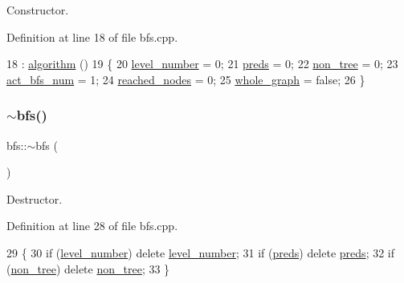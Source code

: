 Constructor. 



Definition at line 18 of file bfs.\+cpp.


\begin{DoxyCode}
18           : \mbox{\hyperlink{classalgorithm_ab79e1ddec2f2afdf4b36b10724db8b15}{algorithm}} () 
19 \{
20     \mbox{\hyperlink{classbfs_aab92e9d128612c28324aafe4750dbc84}{level\_number}} = 0;
21     \mbox{\hyperlink{classbfs_a3bac5ed333bb78a30a67099c3b94aa0c}{preds}} = 0;
22     \mbox{\hyperlink{classbfs_a056b2131db11e62eb8f41c8dcc117d2e}{non\_tree}} = 0;
23     \mbox{\hyperlink{classbfs_a5a4adad9562896536b8b58ab237e8478}{act\_bfs\_num}} = 1;
24     \mbox{\hyperlink{classbfs_ac3db80b59d5db049199936445a6c2da8}{reached\_nodes}} = 0;
25     \mbox{\hyperlink{classbfs_a6c08fbcc90d71f1cbdd03a1cdaa9dc99}{whole\_graph}} = \textcolor{keyword}{false};
26 \}
\end{DoxyCode}
\mbox{\label{classbfs_a6999a08f3cee2b54f07ffeac0d484df1}} 
\subsubsection{\texorpdfstring{$\sim$bfs()}{~bfs()}}
{\footnotesize\ttfamily bfs\+::$\sim$bfs (\begin{DoxyParamCaption}{ }\end{DoxyParamCaption})\hspace{0.3cm}{\ttfamily [virtual]}}



Destructor. 



Definition at line 28 of file bfs.\+cpp.


\begin{DoxyCode}
29 \{
30     \textcolor{keywordflow}{if} (\mbox{\hyperlink{classbfs_aab92e9d128612c28324aafe4750dbc84}{level\_number}}) \textcolor{keyword}{delete} \mbox{\hyperlink{classbfs_aab92e9d128612c28324aafe4750dbc84}{level\_number}};
31     \textcolor{keywordflow}{if} (\mbox{\hyperlink{classbfs_a3bac5ed333bb78a30a67099c3b94aa0c}{preds}}) \textcolor{keyword}{delete} \mbox{\hyperlink{classbfs_a3bac5ed333bb78a30a67099c3b94aa0c}{preds}};
32     \textcolor{keywordflow}{if} (\mbox{\hyperlink{classbfs_a056b2131db11e62eb8f41c8dcc117d2e}{non\_tree}}) \textcolor{keyword}{delete} \mbox{\hyperlink{classbfs_a056b2131db11e62eb8f41c8dcc117d2e}{non\_tree}};
33 \}
\end{DoxyCode}


